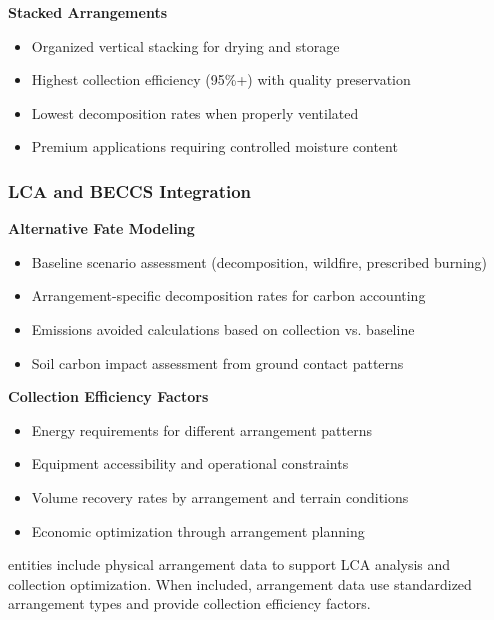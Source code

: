 \textbf{Stacked Arrangements}
\begin{itemize}
    \item Organized vertical stacking for drying and storage
    \item Highest collection efficiency (95\%+) with quality preservation
    \item Lowest decomposition rates when properly ventilated
    \item Premium applications requiring controlled moisture content
\end{itemize}

\subsubsection{LCA and BECCS Integration}

\textbf{Alternative Fate Modeling}
\begin{itemize}
    \item Baseline scenario assessment (decomposition, wildfire, prescribed burning)
    \item Arrangement-specific decomposition rates for carbon accounting
    \item Emissions avoided calculations based on collection vs. baseline
    \item Soil carbon impact assessment from ground contact patterns
\end{itemize}

\textbf{Collection Efficiency Factors}
\begin{itemize}
    \item Energy requirements for different arrangement patterns
    \item Equipment accessibility and operational constraints
    \item Volume recovery rates by arrangement and terrain conditions
    \item Economic optimization through arrangement planning
\end{itemize}

\begin{normative}[title=Physical Arrangement Requirements]
\TRU{} entities \MAY{} include physical arrangement data to support LCA analysis and collection optimization. When included, arrangement data \MUST{} use standardized arrangement types and provide collection efficiency factors.
\end{normative}